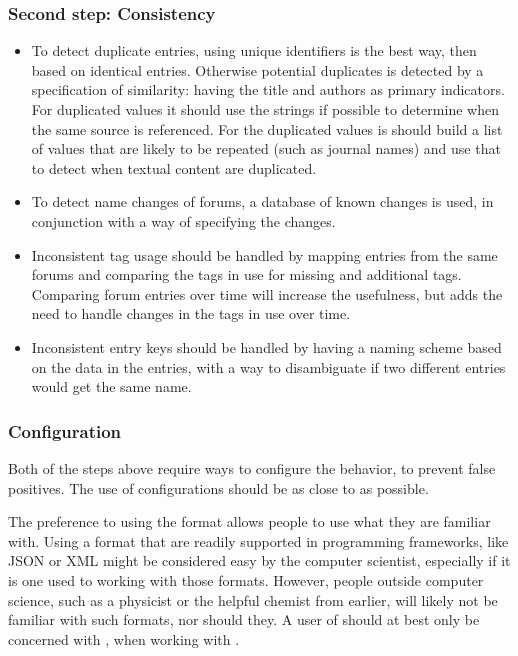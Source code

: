 \subsubsection{Second step: Consistency}
\begin{itemize}
\item To detect duplicate entries, using unique identifiers is the
  best way, then based on identical entries.  Otherwise potential
  duplicates is detected by a specification of similarity: having the
  title and authors as primary indicators.  For duplicated values it
  should use the strings if possible to determine when the same source
  is referenced.  For the duplicated values is should build a list of
  values that are likely to be repeated (such as journal names) and
  use that to detect when textual content are duplicated.

\item To detect name changes of forums, a database of known changes is
  used, in conjunction with a way of specifying the changes.

\item Inconsistent tag usage should be handled by mapping entries from
  the same forums and comparing the tags in use for missing and
  additional tags.  Comparing forum entries over time will increase
  the usefulness, but adds the need to handle changes in the tags in
  use over time.

\item Inconsistent entry keys should be handled by having a naming
  scheme based on the data in the entries, with a way to disambiguate
  if two different entries would get the same name.
\end{itemize}


\subsubsection{Configuration}
\label{sec:analyzing_configuration}

Both of the steps above require ways to configure the behavior, to
prevent false positives.  The use of configurations should be as close
to {\bibtex} as possible.

The preference to using the {\bibtex} format allows people to use what
they are familiar with.  Using a format that are readily supported in
programming frameworks, like JSON or XML might be considered easy by
the computer scientist, especially if it is one used to working with
those formats.  However, people outside computer science, such as a
physicist or the helpful chemist from earlier, will likely not be
familiar with such formats, nor should they.  A user of {\bibtex}
should at best only be concerned with {\bibtex}, when working with
{\bibtex}.

